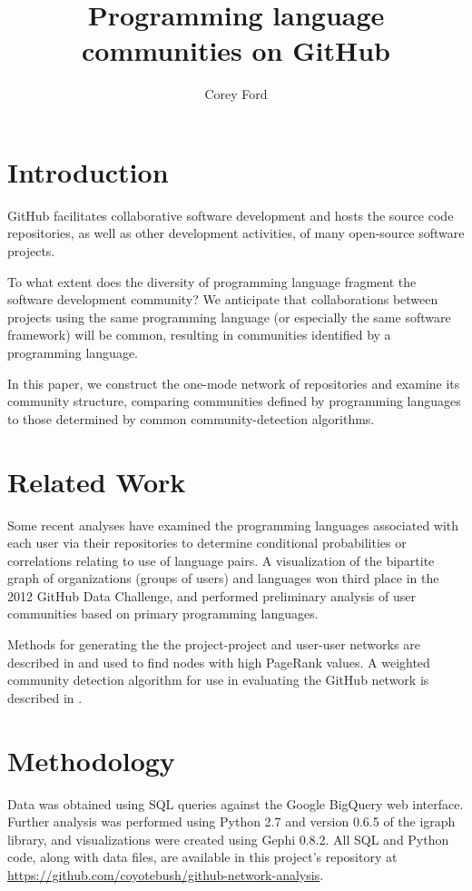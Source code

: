 \documentclass[twocolumn]{article}
\title{Programming language communities on GitHub}
\author{Corey Ford}
\begin{document}
\maketitle

\section{Introduction}

GitHub \cite{github} facilitates collaborative software development and hosts
the source code repositories, as well as other development activities, of many
open-source software projects.

To what extent does the diversity of programming language fragment the software
development community? We anticipate that collaborations between projects using
the same programming language (or especially the same software framework) will
be common, resulting in communities identified by a programming language.

In this paper, we construct the one-mode network of repositories and examine its
community structure, comparing communities defined by programming languages to
those determined by common community-detection algorithms.

\section{Related Work}
Some recent analyses have examined the programming languages associated with
each user via their repositories to determine conditional probabilities
\cite{doll12} or correlations \cite{shah13} relating to use of language pairs. A
visualization of the bipartite graph of organizations (groups of users) and
languages \cite{rodrigues12} won third place in the 2012 GitHub Data Challenge,
and \cite{weber12} performed preliminary analysis of user communities based on
primary programming languages.

Methods for generating the the project-project and user-user networks are
described in \cite{thung2013} and used to find nodes with high PageRank values.
A weighted community detection algorithm for use in evaluating the GitHub
network is described in \cite{marrama}.

\section{Methodology}
Data was obtained using SQL queries against the Google BigQuery web interface.
Further analysis was performed using Python 2.7 and version 0.6.5 of the igraph
library, and visualizations were created using Gephi 0.8.2. All SQL and Python
code, along with data files, are available in this project's repository at
\url{https://github.com/coyotebush/github-network-analysis}.
\end{document}
